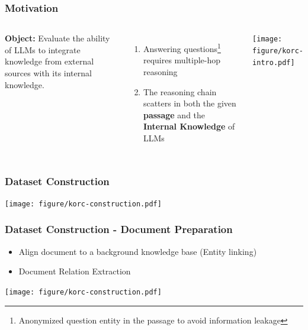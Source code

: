 \documentclass{beamer}
\begin{document}
\begin{frame}
\frametitle{Motivation}
\begin{columns}
    \textbf{Object:} Evaluate the ability of LLMs to integrate knowledge from external sources with its internal knowledge.
    \begin{enumerate}
        \item Answering questions\footnote{Anonymized question entity in the passage to avoid information leakage} requires multiple-hop reasoning
        \item The reasoning chain scatters in both the given \textbf{passage} and the \textbf{Internal Knowledge} of LLMs
        
    \end{enumerate}
    \vspace*{-0.2cm}
    \begin{center}
        \texttt{[image: figure/korc-intro.pdf]}
    \end{center}
\end{columns}
\end{frame}


\begin{frame}
\frametitle{Dataset Construction}
\begin{center}
    \texttt{[image: figure/korc-construction.pdf]}
\end{center}
\end{frame}

\begin{frame}
\frametitle{Dataset Construction - Document Preparation}

    \begin{itemize}
        \item Align document to a background knowledge base (Entity linking)
        \item Document Relation Extraction
    \end{itemize}

    

\begin{center}
    \texttt{[image: figure/korc-construction.pdf]}
\end{center}
 
\end{frame}
\end{document}
